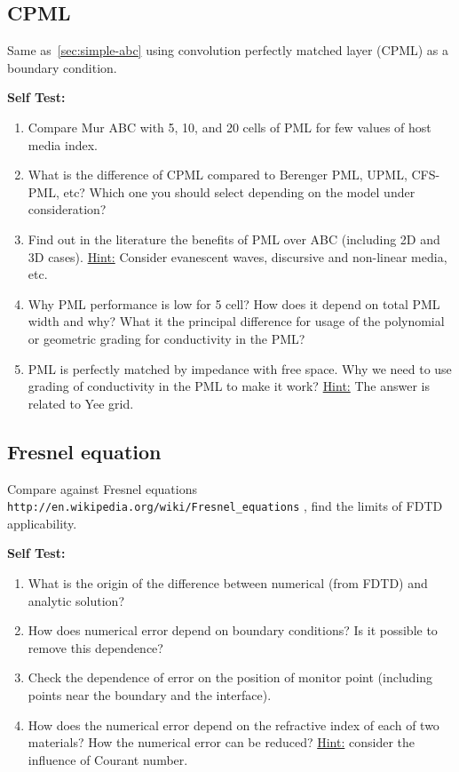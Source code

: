 \documentclass[11pt]{article}
\begin{document}
\subsection{CPML}
\label{sec:cpml}

Same as~\ref{sec:simple-abc} using convolution perfectly matched layer (CPML) as a boundary condition.

\textbf{Self Test:}
\begin{enumerate}
\item Compare Mur ABC with 5, 10, and 20 cells of PML for few values of host media index. 
\item What is the difference of CPML compared to Berenger PML, UPML, CFS-PML, etc? Which one you should select depending on the model under consideration?
\item Find out in the literature the benefits of PML over ABC (including 2D and 3D cases). \underline{Hint:} Consider evanescent waves, discursive and non-linear media, etc.
\item Why PML performance is low for 5 cell? How does it depend on
  total PML width and why?  What it the principal difference for usage of the polynomial or geometric grading for conductivity in the PML?
\item PML is perfectly matched by impedance with free space. Why we
  need to use grading of conductivity in the PML to make it work?
  \underline{Hint:} The answer is related to Yee grid.
\end{enumerate}

\subsection{Fresnel equation}
\label{sec:fresnel-equation}
Compare against Fresnel equations
\verb+http://en.wikipedia.org/wiki/Fresnel_equations+ , find the limits of
FDTD applicability.

\textbf{Self Test:}
\begin{enumerate}
\item What is the origin of the difference between numerical (from
  FDTD) and analytic solution?
\item How does numerical error depend on boundary conditions? Is it
  possible to remove this dependence?
\item Check the dependence of error on the position of monitor point (including points near the boundary and the interface).
\item How does the numerical error depend on the refractive index of  each of two materials? How the numerical error can be reduced? \underline{Hint:} consider the influence of Courant number.
\end{enumerate}
\end{document}
